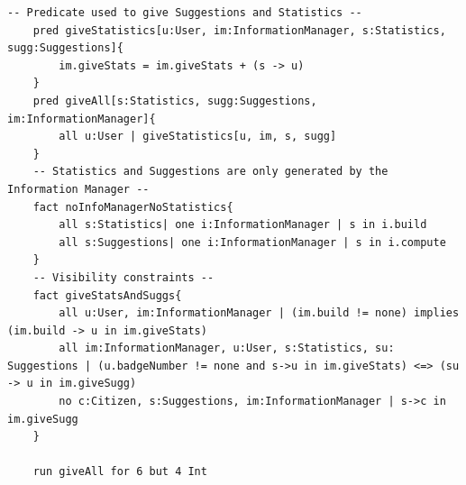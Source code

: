 \documentclass{report}
\begin{document}
\begin{lstlisting}[language=alloy]
	-- Predicate used to give Suggestions and Statistics --
	pred giveStatistics[u:User, im:InformationManager, s:Statistics, sugg:Suggestions]{
		im.giveStats = im.giveStats + (s -> u)
	}
	pred giveAll[s:Statistics, sugg:Suggestions, im:InformationManager]{
		all u:User | giveStatistics[u, im, s, sugg]
	}
	-- Statistics and Suggestions are only generated by the Information Manager --
	fact noInfoManagerNoStatistics{
		all s:Statistics| one i:InformationManager | s in i.build 
		all s:Suggestions| one i:InformationManager | s in i.compute
	}
	-- Visibility constraints --
	fact giveStatsAndSuggs{
		all u:User, im:InformationManager | (im.build != none) implies (im.build -> u in im.giveStats)
		all im:InformationManager, u:User, s:Statistics, su: Suggestions | (u.badgeNumber != none and s->u in im.giveStats) <=> (su -> u in im.giveSugg)
		no c:Citizen, s:Suggestions, im:InformationManager | s->c in im.giveSugg
	}

	run giveAll for 6 but 4 Int
\end{lstlisting}
\end{document}
